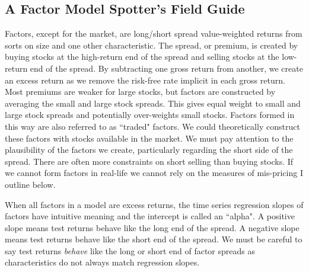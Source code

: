 
\subsection{A Factor Model Spotter's Field Guide}

Factors, except for the market, are long/short spread value-weighted returns from sorts on
size and one other characteristic. The spread, or premium, is created by buying stocks at
the high-return end of the spread and selling stocks at the low-return end of the spread.
By subtracting one gross return from another, we create an excess return as we remove the
risk-free rate implicit in each gross return. Most premiums are weaker for large stocks,
but factors are constructed by averaging the small and large stock spreads. This gives
equal weight to small and large stock spreads and potentially over-weights small stocks.
Factors formed in this way are also referred to as ``traded" factors. We could
theoretically construct these factors with stocks available in the market. We must pay
attention to the plausibility of the factors we create, particularly regarding the short
side of the spread. There are often more constraints on short selling than buying stocks.
If we cannot form factors in real-life we cannot rely on the measures of mis-pricing I
outline below.

When all factors in a model are excess returns, the time series regression slopes of
factors have intuitive meaning and the intercept is called an ``alpha". A positive slope
means test returns behave like the long end of the spread. A negative slope means test
returns behave like the short end of the spread. We must be careful to say test returns
\emph{behave} like the long or short end of factor spreads as characteristics do not
always match regression slopes.

